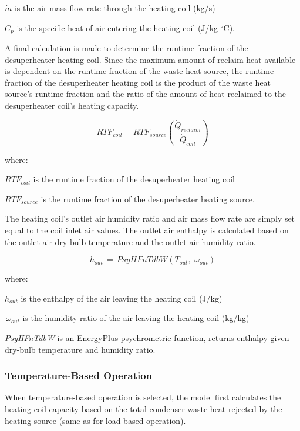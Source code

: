 \(\dot m\) is the air mass flow rate through the heating coil (kg/s)

\({C_p}\) is the specific heat of air entering the heating coil (J/kg-\(^{\circ}\)C).

A final calculation is made to determine the runtime fraction of the desuperheater heating coil. Since the maximum amount of reclaim heat available is dependent on the runtime fraction of the waste heat source, the runtime fraction of the desuperheater heating coil is the product of the waste heat source's runtime fraction and the ratio of the amount of heat reclaimed to the desuperheater coil's heating capacity.

\begin{equation}
RT{F_{coil}} = RT{F_{source}}\left( {\frac{{{{\dot Q}_{reclaim}}}}{{{{\dot Q}_{coil}}}}} \right)
\end{equation}

where:

\(RT{F_{coil}}\) is the runtime fraction of the desuperheater heating coil

\(RT{F_{source}}\) is the runtime fraction of the desuperheater heating source.

The heating coil's outlet air humidity ratio and air mass flow rate are simply set equal to the coil inlet air values. The outlet air enthalpy is calculated based on the outlet air dry-bulb temperature and the outlet air humidity ratio.

\begin{equation}
{h_{out}}\, = \,PsyHFnTdbW({T_{out}},\,\,{\omega_{out}})
\end{equation}

where:

\({h_{out}}\) is the enthalpy of the air leaving the heating coil (J/kg)

\(\,{\omega_{out}}\) is the humidity ratio of the air leaving the heating coil (kg/kg)

\emph{PsyHFnTdbW} is an EnergyPlus psychrometric function, returns enthalpy given dry-bulb temperature and humidity ratio.

\subsubsection{Temperature-Based Operation}\label{temperature-based-operation}

When temperature-based operation is selected, the model first calculates the heating coil capacity based on the total condenser waste heat rejected by the heating source (same as for load-based operation).


